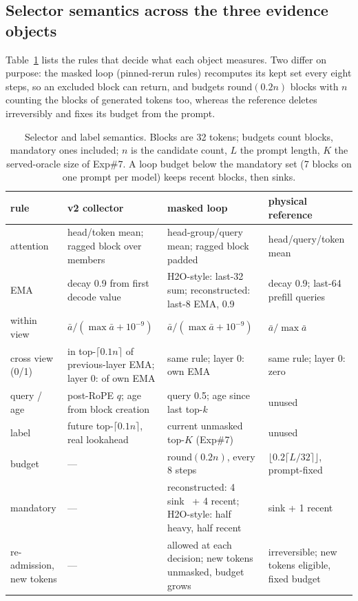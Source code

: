 \subsection{Selector semantics across the three evidence objects}
\label{sec:protocol}
Table~\ref{tab:protocol} lists the rules that decide what each object measures. Two
differ on purpose: the masked loop (pinned-rerun rules) recomputes its kept set every
eight steps, so an
excluded block can return, and budgets $\mathrm{round}(0.2n)$ blocks with $n$
counting the blocks of generated tokens too, whereas the reference deletes
irreversibly and fixes its budget from the prompt.

\begin{table}[t]
\centering
\caption{Selector and label semantics. Blocks are 32 tokens; budgets count blocks,
mandatory ones included; $n$ is the candidate count, $L$ the prompt length, $K$ the
served-oracle size of Exp\#7. A loop budget below the mandatory set (7 blocks on one
prompt per model) keeps recent blocks, then sinks.}
\label{tab:protocol}
\footnotesize
\setlength{\tabcolsep}{2.5pt}
\begin{tabular}{@{}>{\raggedright\arraybackslash}p{}>{\raggedright\arraybackslash}p{}>{\raggedright\arraybackslash}p{}>{\raggedright\arraybackslash}p{}@{}}
\toprule
rule & v2 collector & masked loop & physical reference \\
\midrule
attention & head/token mean; ragged block over members & head-group/query mean; ragged block padded & head/query/token mean \\
EMA & decay 0.9 from first decode value & H2O-style: last-32 sum; reconstructed: last-8 EMA, 0.9 & decay 0.9; last-64 prefill queries \\
within view & $\bar a/(\max\bar a+10^{-9})$ & $\bar a/(\max\bar a+10^{-9})$ & $\bar a/\max\bar a$ \\
cross view (0/1) & in top-$\lceil0.1n\rceil$ of previous-layer EMA; layer 0: of own EMA & same rule; layer 0: own EMA & same rule; layer 0: zero \\
query / age & post-RoPE $q$; age from block creation & query 0.5; age since last top-$k$ & unused \\
label & future top-$\lceil0.1n\rceil$, real lookahead & current unmasked top-$K$ (Exp\#7) & unused \\
budget & --- & round$(0.2n)$, every 8 steps & $\lfloor0.2\lceil L/32\rceil\rfloor$, prompt-fixed \\
mandatory & --- & reconstructed: 4 sink~\cite{streamingllm} + 4 recent; H2O-style: half heavy, half recent & 1 sink + 1 recent \\
re-admission, new tokens & --- & allowed at each decision; new tokens unmasked, budget grows & irreversible; new tokens eligible, fixed budget \\
\bottomrule
\end{tabular}
\end{table}
